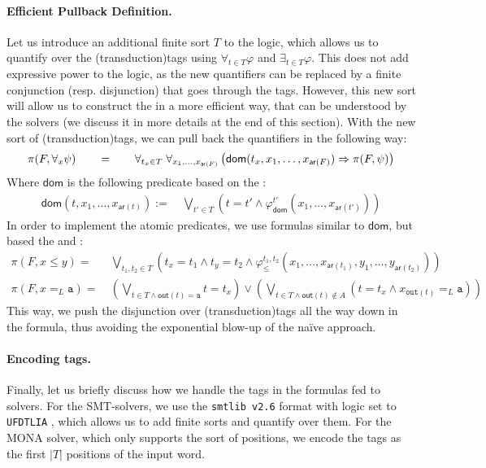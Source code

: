 \paragraph{Efficient Pullback Definition.} Let us introduce an additional
finite sort $T$ to the logic, which allows us to quantify over the \kl(transduction){tags} using
$\forall_{t \in T} \varphi$ and $\exists_{t \in T} \varphi$. This does not add
expressive power to the logic, as the new quantifiers can be replaced by a
finite conjunction (resp. disjunction) that goes through the tags. However,
this new sort will allow us to construct the  in a more
efficient way, that can be understood by the solvers (we discuss it in more
details at the end of this section). With the new sort of \kl(transduction){tags}, we can
pull back the quantifiers in the following way: 
\[ 
\begin{tabular}{ccc}
   $ \pi(F, \forall_{x} \psi)$ & $\quad = \quad$ & $\forall_{t_x \in T} \; \forall_{x_1, \ldots, x_{\mathsf{ar}(F)}} \left( {\mathsf{dom}}(t_x, x_1, \ldots, x_{\mathsf{ar}(F)}) \Rightarrow \pi(F, \psi)\right)$
\end{tabular}
\]
Where $\mathsf{dom}$ is the following predicate based on 
the :
\begin{align*}
    \mathsf{dom}(t, x_1, \ldots, x_{\mathsf{ar}(t)}) :=&~ \bigvee_{t' \in T} \left( t = t' \wedge \varphi_{\mathsf{dom}}^{t'}(x_1, \ldots, x_{\mathsf{ar}(t')}) \right)
\end{align*}
In order to implement the atomic predicates,
we use  formulas similar to $\mathsf{dom}$, but based the  and :
\begin{align*}
   \pi(F, x \leq y)  =&~ \bigvee_{t_1, t_2 \in T} \left( t_x = t_1 \wedge t_y = t_2 \wedge \varphi_{\leq}^{t_1, t_2}(x_1, \ldots, x_{\mathsf{ar}(t_1)}, y_1, \ldots, y_{\mathsf{ar}(t_2)}) \right) \\
   \pi(F, x =_L \mathtt{a}) =&~ \left(\bigvee_{t \in T \wedge \mathsf{out}(t) = \mathtt{a}} t = t_x\right) \vee
\left(\bigvee_{t \in T \wedge \mathsf{out}(t) \not \in A} (t = t_x \wedge x_{\mathtt{out}(t)} =_L \mathtt{a})\right)
\end{align*}
This way, we push the disjunction over \kl(transduction){tags} all the way down in the formula,
thus avoiding the exponential blow-up of the naïve approach.

\paragraph{Encoding tags.} Finally, let us briefly discuss how we handle the
tags in the formulas fed to solvers. For the SMT-solvers, we use the
\texttt{smtlib v2.6} format with logic set to \texttt{UFDTLIA}
\cite{BARRETT17}, which allows us to add finite sorts and quantify over them.
For the MONA solver, which only supports the sort of positions, we encode the
tags as the first $|T|$ positions of the input word.


